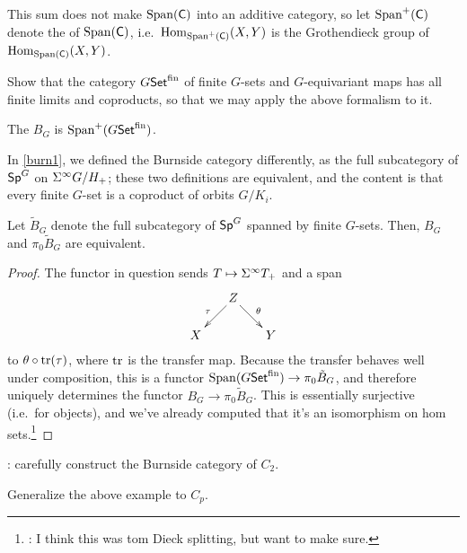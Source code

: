 This sum does not make $\operatorname{Span}(\mathsf C)$ into an additive category, so let $\operatorname{Span}^+(\mathsf C)$ denote the  of $\operatorname{Span}(\mathsf C)$, i.e.\ $\operatorname{Hom}_{\operatorname{Span}^+(\mathsf C)}(X,Y)$ is the Grothendieck group of
$\operatorname{Hom}_{\operatorname{Span}(\mathsf C)}(X,Y)$.
\begin{ex}
Show that the category $G\mathsf{Set}^{\mathrm{fin}}$ of finite $G$-sets and $G$-equivariant maps has all finite limits and
coproducts, so that we may apply the above formalism to it.
\end{ex}
\begin{defn}
\label{burn2}
The  $B_G$ is $\operatorname{Span}^+(G\mathsf{Set}^{\mathrm{fin}})$.
\end{defn}
In \cref{burn1}, we defined the Burnside category differently, as the full subcategory of $\mathsf{Sp}^G$ on $\Sigma^\infty G/H_+$;
these two definitions are equivalent, and the content is that every finite $G$-set is a coproduct of orbits
$G/K_i$.
\begin{prop}
Let $\tilde B_G$ denote the full subcategory of $\mathsf{Sp}^G$ spanned by finite $G$-sets. Then, $B_G$ and $\pi_0\tilde
B_G$ are equivalent.
\end{prop}
\begin{proof}
The functor in question sends $T\mapsto\sus T_+$ and a span
\[\xymatrix@dr{
	Z\ar[r]^\theta\ar[d]_\tau & Y\\
	X
}\]
to $\theta\circ\operatorname{tr}(\tau)$, where $\operatorname{tr}$ is the transfer map. Because the transfer behaves well under composition,
this is a functor $\operatorname{Span}(G\mathsf{Set}^{\mathrm{fin}})\to\pi_0\tilde B_G$, and therefore uniquely determines the functor
$B_G\to\pi_0\tilde B_G$. This is essentially surjective (i.e.\ for objects), and we've already computed that it's
an isomorphism on hom sets.\footnote{\TODO: I think this was tom Dieck splitting, but want to make sure.}
\end{proof}
\begin{exm}
\TODO: carefully construct the Burnside category of $C_2$.
\end{exm}
\begin{ex}
Generalize the above example to $C_p$.
\end{ex}
